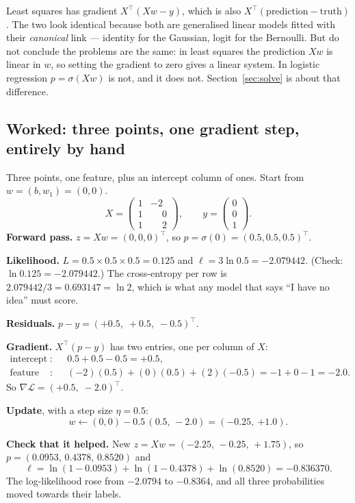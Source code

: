 \documentclass[11pt]{article}
\begin{document}
\begin{caution}
Least squares has gradient $X^{\!\top}(Xw - y)$, which is also
$X^{\!\top}(\text{prediction} - \text{truth})$. The two look identical because
both are generalised linear models fitted with their \emph{canonical} link ---
identity for the Gaussian, logit for the Bernoulli. But do not conclude the
problems are the same: in least squares the prediction $Xw$ is linear in $w$,
so setting the gradient to zero gives a linear system. In logistic regression
$p = \sigma(Xw)$ is not, and it does not. Section~\ref{sec:solve} is about
that difference.
\end{caution}

\subsection{Worked: three points, one gradient step, entirely by hand}
\label{sec:handstep}

\begin{worked}
Three points, one feature, plus an intercept column of ones. Start from
$w = (b, w_1) = (0, 0)$.
\[
  X = \begin{pmatrix} 1 & -2\\ 1 & \phantom{-}0\\ 1 & \phantom{-}2\end{pmatrix},
  \qquad
  y = \begin{pmatrix} 0\\ 0\\ 1\end{pmatrix}.
\]
\textbf{Forward pass.} $z = Xw = (0,0,0)^{\!\top}$, so
$p = \sigma(0) = (0.5, 0.5, 0.5)^{\!\top}$.

\textbf{Likelihood.} $L = 0.5 \times 0.5 \times 0.5 = 0.125$ and
$\ell = 3\ln 0.5 = -2.079442$. (Check: $\ln 0.125 = -2.079442$.) The
cross-entropy per row is $2.079442/3 = 0.693147 = \ln 2$, which is what any
model that says ``I have no idea'' must score.

\textbf{Residuals.} $p - y = (+0.5,\; +0.5,\; -0.5)^{\!\top}$.

\textbf{Gradient.} $X^{\!\top}(p-y)$ has two entries, one per column of $X$:
\begin{align*}
  \text{intercept column}: &\quad 0.5 + 0.5 - 0.5 = +0.5,\\
  \text{feature column}:   &\quad (-2)(0.5) + (0)(0.5) + (2)(-0.5)
                              = -1 + 0 - 1 = -2.0 .
\end{align*}
So $\nabla\mathcal{L} = (+0.5,\; -2.0)^{\!\top}$.

\textbf{Update}, with a step size $\eta = 0.5$:
\[
  w \leftarrow (0, 0) - 0.5\,(0.5,\, -2.0) = (\mathbf{-0.25},\ \mathbf{+1.0}).
\]

\textbf{Check that it helped.} New $z = Xw = (-2.25,\, -0.25,\, +1.75)$, so
$p = (0.0953,\, 0.4378,\, 0.8520)$ and
\[
  \ell = \ln(1-0.0953) + \ln(1-0.4378) + \ln(0.8520) = -0.836370 .
\]
The log-likelihood rose from $-2.0794$ to $-0.8364$, and all three
probabilities moved towards their labels.
\end{worked}
\end{document}
